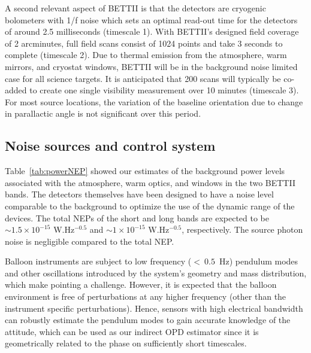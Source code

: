 A second relevant aspect of BETTII is that the detectors are cryogenic bolometers \cite[see][for similar architectures]{Staguhn:2014kl} with 1/f noise which
sets an optimal read-out time for the detectors of around 2.5 milliseconds (timescale 1). With BETTII's designed field coverage
of 2 arcminutes, full field scans consist of 1024 points and take 3 seconds to complete (timescale 2). Due to thermal emission from the atmosphere,
warm mirrors, and cryostat windows, BETTII will be in the background noise limited case for all science targets.
It is anticipated that 200 scans will typically be co-added to create one single visibility measurement over 10 minutes (timescale 3). 
For most source locations, the variation of the baseline orientation due to change in parallactic angle is not significant over this period.

\subsection{Noise sources and control system}
Table~\ref{tab:powerNEP} showed our estimates of the
background power levels associated with the atmosphere, warm optics, and windows in the two BETTII bands. 
The detectors themselves have been designed to have a noise level comparable to the background to optimize the use of the
dynamic range of the devices. The total NEPs of the short and long bands are expected to be $\sim 1.5\times 10^{-15}$ W.Hz$^{-0.5}$ and $\sim 1\times 10^{-15}$ W.Hz$^{-0.5}$, respectively. The source photon noise is negligible compared to the total NEP. 

Balloon instruments are subject to low frequency ($<~0.5$~Hz) pendulum modes and other oscillations introduced by the system's geometry and mass distribution, which make pointing a challenge. However, it is expected that the balloon environment is free of perturbations at any higher frequency (other than the instrument specific perturbations). Hence, sensors with high electrical bandwidth can robustly estimate the pendulum modes to gain accurate knowledge of the attitude, which can be used as our indirect OPD estimator since it is geometrically related to the phase on sufficiently short timescales.


